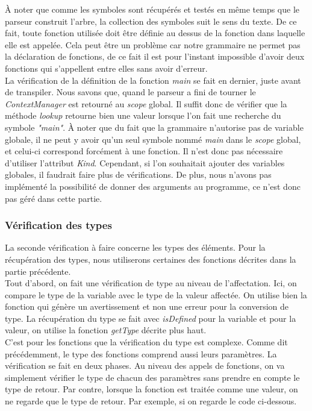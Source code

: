 \documentclass[a4paper]{article}%
\begin{document}
À noter que comme les symboles sont récupérés et testés en même temps que le
parseur construit l'arbre, la collection des symboles suit le sens du texte. De
ce fait, toute fonction utilisée doit être définie au dessus de la fonction dans
laquelle elle est appelée. Cela peut être un problème car notre grammaire ne
permet pas la déclaration de fonctions, de ce fait il est pour l'instant
impossible d'avoir deux fonctions qui s'appellent entre elles sans avoir
d'erreur.\\

La vérification de la définition de la fonction \textit{main} se fait en
dernier, juste avant de transpiler. Nous savons que, quand le parseur a fini de
tourner le \textit{ContextManager} est retourné au \textit{scope} global. Il
suffit donc de vérifier que la méthode \textit{lookup} retourne bien une valeur
lorsque l'on fait une recherche du symbole \textit{"main"}. À noter que du fait
que la grammaire n'autorise pas de variable globale, il ne peut y avoir qu'un
seul symbole nommé \textit{main} dans le \textit{scope} global, et celui-ci
correspond forcément à une fonction. Il n'est donc pas nécessaire d'utiliser
l'attribut \textit{Kind}. Cependant, si l'on souhaitait ajouter des variables
globales, il faudrait faire plus de vérifications. De plus, nous n'avons pas
implémenté la possibilité de donner des arguments au programme, ce n'est donc
pas géré dans cette partie.

\subsubsection*{Vérification des types}

La seconde vérification à faire concerne les types des éléments. Pour la
récupération des types, nous utiliserons certaines des fonctions décrites dans la
partie précédente.\\

Tout d'abord, on fait une vérification de type au niveau de l'affectation.
Ici, on compare le type de la variable avec le type de la valeur affectée. On
utilise bien la fonction qui génère un avertissement et non une erreur pour la
conversion de type. La récupération du type se fait avec \textit{isDefined}
pour la variable et pour la valeur, on utilise la fonction \textit{getType}
décrite plus haut.\\

C'est pour les fonctions que la vérification du type est complexe. Comme dit
précédemment, le type des fonctions comprend aussi leurs paramètres. La
vérification se fait en deux phases. Au niveau des appels de fonctions, on va
simplement vérifier le type de chacun des paramètres sans prendre en compte le
type de retour. Par contre, lorsque la fonction est traitée comme une valeur, on
ne regarde que le type de retour. Par exemple, si on regarde le code ci-dessous.
\end{document}
